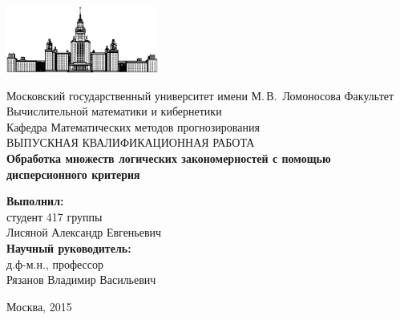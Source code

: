 \documentclass[12pt]{article}
\begin{document}
\begin{titlepage}
\begin{center}

    \bigskip
    \includegraphics[width=50mm]{msu.eps}

    \bigskip
    Московский государственный университет имени М.\,В.~Ломоносова
    Факультет Вычислительной математики и кибернетики\\
    Кафедра Математических методов прогнозирования\\[30mm]

    \textsf{\large
      ВЫПУСКНАЯ КВАЛИФИКАЦИОННАЯ РАБОТА\\[10mm]
      \textbf{
        Обработка множеств логических закономерностей с помощью
        дисперсионного критерия
      }
    }\\[30mm]

    \begin{flushright}
      \parbox{0.5\textwidth}{
        \raggedleft
        \textbf{Выполнил:}\\
        студент 417 группы\\
        Лисяной Александр Евгеньевич\\[5mm]
        \textbf{Научный руководитель:}\\
        д.ф-м.н., профессор\\
        Рязанов Владимир Васильевич
      }
    \end{flushright}

    \vspace{\fill}
    Москва, 2015
\end{center}
\end{titlepage}

\newpage
\renewcommand{\contentsname}{Содержание}
\tableofcontents

\end{document}
